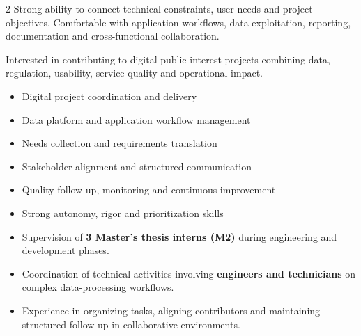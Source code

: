 \documentclass[8pt,a4paper,ragged2e,withhyper]{altacv}
\begin{document}
\begin{paracol}{2}
Strong ability to connect technical constraints, user needs and project objectives. Comfortable with application workflows, data exploitation, reporting, documentation and cross-functional collaboration.

Interested in contributing to digital public-interest projects combining data, regulation, usability, service quality and operational impact.


\begin{itemize}
\item Digital project coordination and delivery
\item Data platform and application workflow management
\item Needs collection and requirements translation
\item Stakeholder alignment and structured communication
\item Quality follow-up, monitoring and continuous improvement
\item Strong autonomy, rigor and prioritization skills
\end{itemize}


\begin{itemize}
\item Supervision of \textbf{3 Master’s thesis interns (M2)} during engineering and development phases.
\item Coordination of technical activities involving \textbf{engineers and technicians} on complex data-processing workflows.
\item Experience in organizing tasks, aligning contributors and maintaining structured follow-up in collaborative environments.
\end{itemize}

\divider
{}
\divider
{}

\medskip

\divider
{}
\divider
{}
\divider
{}


\end{paracol}
\end{document}
